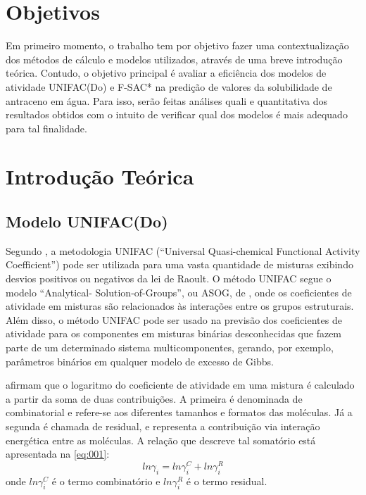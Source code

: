 \section{Objetivos}

Em primeiro momento, o trabalho tem por objetivo fazer uma contextualização dos
métodos de cálculo e modelos utilizados, através de uma breve introdução
teórica. Contudo, o objetivo principal é avaliar a eficiência dos modelos de
atividade UNIFAC(Do) e F-SAC* na predição de valores da solubilidade de
antraceno em água. Para isso, serão feitas análises quali e quantitativa dos
resultados obtidos com o intuito de verificar qual dos modelos é mais adequado
para tal finalidade.

\section{Introdução Teórica}

\subsection{Modelo UNIFAC(Do)}

Segundo , a metodologia UNIFAC (“Universal Quasi-chemical Functional Activity Coefficient”) pode ser utilizada para uma vasta quantidade de misturas exibindo desvios positivos ou
 negativos da lei de Raoult. O método UNIFAC segue o modelo “Analytical-
Solution-of-Groups”, ou ASOG, de , onde os coeficientes
 de atividade em misturas são relacionados às interações entre os grupos
 estruturais. Além disso, o método UNIFAC pode ser usado na previsão dos
 coeficientes de atividade para os componentes em misturas binárias desconhecidas que fazem parte de um determinado sistema multicomponentes, gerando, por exemplo, parâmetros binários em
 qualquer modelo de excesso de Gibbs.

 afirmam que o logaritmo do coeficiente de atividade em uma mistura é calculado a partir da soma de duas contribuições. A primeira é denominada de combinatorial e refere-se aos diferentes tamanhos e formatos das moléculas. Já a segunda é chamada de residual, e representa a contribuição via interação energética entre
 as moléculas. A relação que descreve tal somatório está apresentada na
 \autoref{eq:001}:
\begin{equation}\label{eq:001}ln\gamma_i = ln\gamma_i^C +
ln\gamma_i^R\end{equation}
onde
$ln\gamma_i^C$ é o termo combinatório e $ln\gamma_i^R$ 
é o termo residual.

